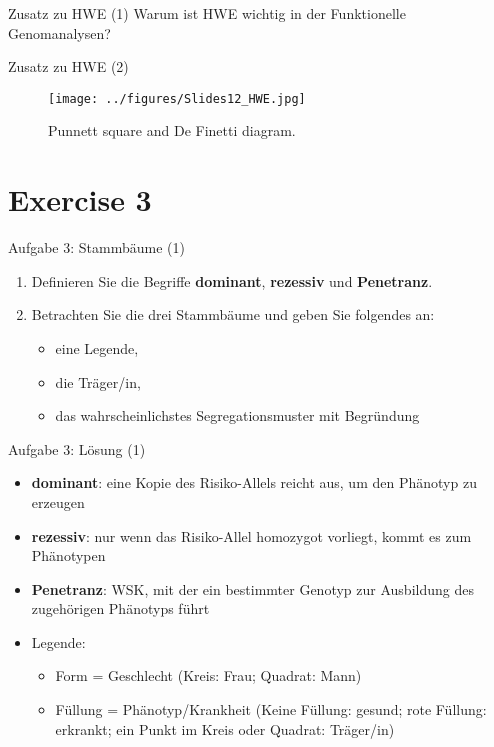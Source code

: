 \documentclass{beamer}
\begin{document}
\begin{frame}{Zusatz zu HWE (1)}
Warum ist HWE wichtig in der Funktionelle Genomanalysen?    
\end{frame}

\begin{frame}{Zusatz zu HWE (2)}
\begin{figure}[h]
\begin{center}
\texttt{[image: ../figures/Slides12\_HWE.jpg]}
\caption{Punnett square and De Finetti diagram.}
\label{fig:HWE}
\end{center}
\end{figure}
\end{frame}

\section{Exercise 3}

\begin{frame}{Aufgabe 3: Stammbäume (1)}
\begin{enumerate}
    \item Definieren Sie die Begriffe \textbf{dominant}, \textbf{rezessiv} und \textbf{Penetranz}.
    \item Betrachten Sie die drei Stammbäume und geben Sie folgendes an:
    \begin{itemize}
        \item eine Legende,
        \item die Träger/in,
        \item das wahrscheinlichstes Segregationsmuster mit Begründung
    \end{itemize}
\end{enumerate}
\end{frame}

\begin{frame}{Aufgabe 3: Lösung (1)}
\begin{itemize}
    \item \textbf{dominant}: eine Kopie des Risiko-Allels reicht aus, um den Phänotyp zu erzeugen
    \item \textbf{rezessiv}: nur wenn das Risiko-Allel homozygot vorliegt, kommt es zum Phänotypen
    \item \textbf{Penetranz}: WSK, mit der ein bestimmter Genotyp zur Ausbildung des zugehörigen Phänotyps führt
    \item Legende:
    \begin{itemize}
        \item Form = Geschlecht (Kreis: Frau; Quadrat: Mann)
        \item Füllung = Phänotyp/Krankheit (Keine Füllung: gesund; rote Füllung: erkrankt; ein Punkt im Kreis oder Quadrat: Träger/in)
    \end{itemize}
\end{itemize}
\end{frame}
\end{document}
